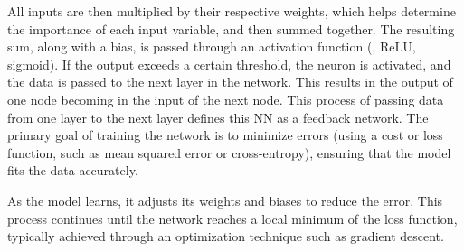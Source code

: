 All inputs are then multiplied by their respective weights, which helps determine the importance of each input variable, and then summed together.
The resulting sum, along with a bias, is passed through an activation function (\eg{}, ReLU, sigmoid).
If the output exceeds a certain threshold, the neuron is activated, and the data is passed to the next layer in the network.
This results in the output of one node becoming in the input of the next node.
This process of passing data from one layer to the next layer defines this NN as a feedback network.
The primary goal of training the network is to minimize errors (using a cost or loss function, such as mean squared error or cross-entropy), ensuring that the model fits the data accurately.

As the model learns, it adjusts its weights and biases to reduce the error. This process continues until the network reaches a local minimum of the loss function, typically achieved through an optimization technique such as gradient descent.
